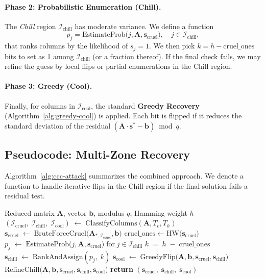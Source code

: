 \documentclass[11pt]{article}
\begin{document}
\paragraph{Phase 2: Probabilistic Enumeration (Chill).}
The \emph{Chill} region $\mathcal{I}_{\mathrm{chill}}$ has moderate variance. We define a function 
\[
  p_j = \mathrm{EstimateProb}\bigl(j,\mathbf{A},\mathbf{s}_{\mathrm{cruel}}\bigr), \quad
  j \in \mathcal{I}_{\mathrm{chill}},
\]
that ranks columns by the likelihood of $s_j=1$. We then pick $k = h - \mathrm{cruel\_ones}$ bits to set as 1 among $\mathcal{I}_{\mathrm{chill}}$ (or a fraction thereof). If the final check fails, we may refine the guess by local flips or partial enumerations in the Chill region.

\paragraph{Phase 3: Greedy (Cool).}
Finally, for columns in $\mathcal{I}_{\mathrm{cool}}$, the standard \textbf{Greedy Recovery} (Algorithm~\ref{alg:greedy-cool}) is applied. Each bit is flipped if it reduces the standard deviation of the residual $(\mathbf{A}\cdot \mathbf{s}^* - \mathbf{b})\bmod q$. 

\subsection{Pseudocode: Multi-Zone Recovery}
\label{subsec:multi-zone-pseudocode}

Algorithm~\ref{alg:ccc-attack} summarizes the combined approach. We denote a function  to handle iterative flips in the Chill region if the final solution fails a residual test.

\begin{algorithm}[ht]
\caption{\small Multi-Zone Attack: Cool, Chill, and Cruel}
\label{alg:ccc-attack}
\begin{algorithmic}[1]
\Require Reduced matrix $\mathbf{A}$, vector $\mathbf{b}$, modulus $q$, Hamming weight $h$
\State $(\mathcal{I}_{\mathrm{cruel}},\;\mathcal{I}_{\mathrm{chill}},\;\mathcal{I}_{\mathrm{cool}}) \;\gets\; \text{ClassifyColumns}(\mathbf{A}, T_c, T_h)$
\State $\mathbf{s}_{\mathrm{cruel}} \;\gets\; \mathrm{BruteForceCruel}\bigl(\mathbf{A}_{*,\mathcal{I}_{\mathrm{cruel}}}, \mathbf{b}\bigr)$
\State $\mathrm{cruel\_ones} \gets \mathrm{HW}\bigl(\mathbf{s}_{\mathrm{cruel}}\bigr)$
\State $p_j \;\gets\; \mathrm{EstimateProb}\bigl(j,\mathbf{A},\mathbf{s}_{\mathrm{cruel}}\bigr)\; \text{for}\; j\in \mathcal{I}_{\mathrm{chill}}$
\State $k \;=\; h \;-\; \mathrm{cruel\_ones}$
\State $\mathbf{s}_{\mathrm{chill}} \;\gets\; \mathrm{RankAndAssign}(p_j,\;k)$
\State $\mathbf{s}_{\mathrm{cool}} \;\gets\; \mathrm{GreedyFlip}\bigl(\mathbf{A},\mathbf{b},\mathbf{s}_{\mathrm{cruel}},\mathbf{s}_{\mathrm{chill}}\bigr)$
\State $\mathrm{RefineChill}\bigl(\mathbf{A},\mathbf{b},\mathbf{s}_{\mathrm{cruel}},\mathbf{s}_{\mathrm{chill}},\mathbf{s}_{\mathrm{cool}}\bigr)$
\State \textbf{return} $(\mathbf{s}_{\mathrm{cruel}},\;\mathbf{s}_{\mathrm{chill}},\;\mathbf{s}_{\mathrm{cool}})$
\end{algorithmic}
\end{algorithm}
\end{document}
